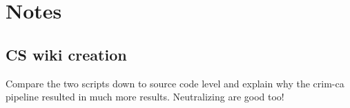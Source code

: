 \chapter{Notes}
\section{CS wiki creation}
Compare the two scripts down to source code level and explain why the crim-ca pipeline resulted in much more results. Neutralizing are good too!